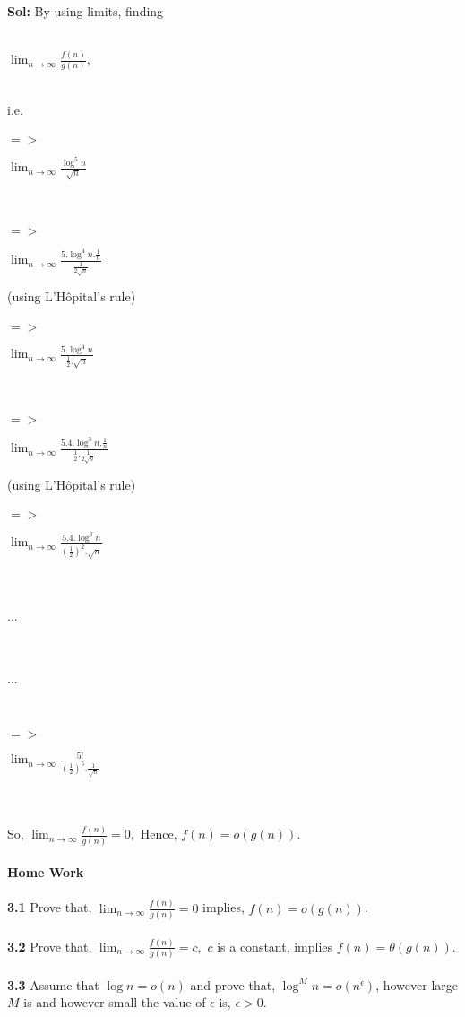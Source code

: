 \documentclass[a4paper, 12pt]{article}
\begin{document}
\paragraph{}
 	\textbf{Sol:} By using limits, finding 
 	\\ \\ \centerline{$\lim_{n\to\infty}\frac{f(n)}{g(n)}$,}  
 	\\ i.e.
	\\ \\ $=>$ \centerline{$\lim_{n\to\infty}\frac{\log^{5} n}{\sqrt{n}}$}
	\\ \\ $=>$\centerline{$\lim_{n\to\infty}\frac{5.\log^{4} n.\frac{1}{n}}{\frac{1}{2\sqrt{n}}}$}
	\hspace*{\fill}(using L’Hôpital’s rule)
	\\ \\ $=>$ \centerline{$\lim_{n\to\infty}\frac{5.\log^{4} n}{\frac{1}{2}.\sqrt{n}}$}				
	\\ \\ $=>$ \centerline{$\lim_{n\to\infty}\frac{5.4.\log^{3} n.\frac{1}{n}}{\frac{1}{2}.\frac{1}{2\sqrt{n}}}$}
 	\hspace*{\fill} (using L’Hôpital’s rule)
	\\ \\ $=>$\centerline{$\lim_{n\to\infty}\frac{5.4.\log^{3} n}{(\frac{1}{2})^{2}.\sqrt{n}}$}
	\\ \\ \centerline{$...$}
	\\ \\ \centerline{$...$}
	\\ \\ $=>$  \centerline{$\lim_{n\to\infty}\frac{5!}{(\frac{1}{2})^{5}.\frac{1}{\sqrt{n}}}$}
	\\ \\ So, $\lim_{n\to\infty}\frac{f(n)}{g(n)} = 0,$
	Hence, $f(n)=o(g(n)).$
\paragraph{}
	\textbf{Home Work}
\paragraph{}
	\textbf{3.1} Prove that, $\lim_{n\to\infty}\frac{f(n)}{g(n)} = 0$ implies, $f(n)=o(g(n))$.
\paragraph{}
	\textbf{3.2} Prove that, $\lim_{n\to\infty}\frac{f(n)}{g(n)} = c,$ $c$ is a constant, implies $f(n)= \theta(g(n))$.
\paragraph{}
	\textbf{3.3} Assume that $\log n = o(n)$ and prove that, $\log^{M} n = o(n^{\epsilon})$, however large $M$ is and however small the value of $\epsilon$ is, $\epsilon>0$.
\end{document}
